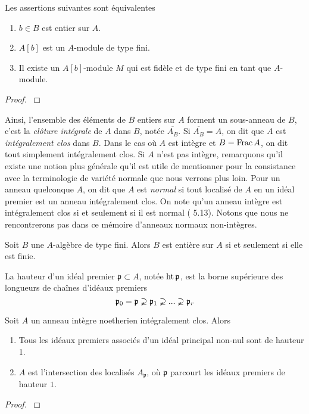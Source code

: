 \begin{prop}
Les assertions suivantes sont équivalentes
\begin{enumerate}
\item $b\in B$ est entier sur $A$.
\item $A[b]$ est un $A$-module de type fini.
\item Il existe un $A[b]$-module $M$ qui est fidèle et de type fini en tant que $A$-module.
\end{enumerate}
\end{prop}
\begin{proof}
\cite[5.1]{atiyahmacdo}
\end{proof}

Ainsi, l'ensemble des éléments de $B$ entiers sur $A$ forment un sous-anneau de $B$, c'est la \textit{clôture intégrale} de $A$ dans $B$, notée $\overline{A_B}$. Si $\overline{A_B}=A$, on dit que $A$ est \textit{intégralement clos} dans $B$. Dans le cas où $A$ est intègre et $B=\operatorname{Frac} A$, on dit tout simplement intégralement clos. Si $A$ n'est pas intègre, remarquons qu'il existe une notion plus générale qu'il est utile de mentionner pour la consistance avec la terminologie de variété normale que nous verrons plus loin. Pour un anneau quelconque $A$, on dit que $A$ est \textit{normal} si tout localisé de $A$ en un idéal premier est un anneau intégralement clos. On note qu'un anneau intègre est intégralement clos si et seulement si il est normal (\cite{atiyahmacdo} 5.13). Notons que nous ne rencontrerons pas dans ce mémoire d'anneaux normaux non-intègres.

\begin{cor}
Soit $B$ une $A$-algèbre de type fini. Alors $B$ est entière sur $A$ si et seulement si elle est finie.
\end{cor}

\begin{defn}
La hauteur d'un idéal premier $\mathfrak{p}\subset A$, notée $\operatorname{ht} \mathfrak{p}$, est la borne supérieure des longueurs de chaînes d'idéaux premiers
$$\mathfrak{p}_0=\mathfrak{p}\varsupsetneq \mathfrak{p}_1 \varsupsetneq...\varsupsetneq  \mathfrak{p}_r$$
\end{defn}


\begin{thm}\label{factonormal}
Soit $A$ un anneau intègre noetherien intégralement clos. Alors
\begin{enumerate}
\item Tous les idéaux premiers associés d'un idéal principal non-nul sont de hauteur 1.
\item $A$ est l'intersection des localisés $A_\mathfrak{p}$, où $\mathfrak{p}$ parcourt les idéaux premiers de hauteur $1$.
\end{enumerate}
\end{thm}
\begin{proof}
\cite[11.5]{Matsumura} 
\end{proof}


